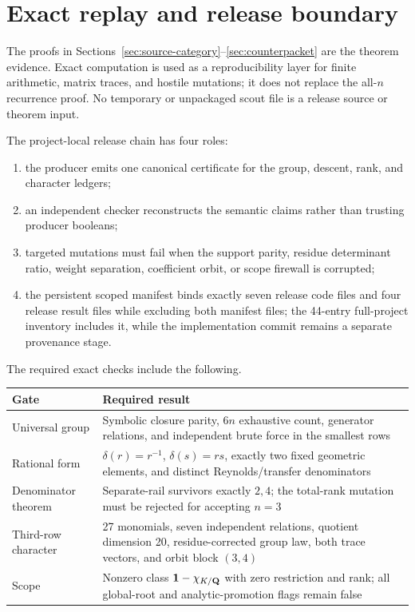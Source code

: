 \section{Exact replay and release boundary}
\label{sec:replay}

The proofs in Sections~\ref{sec:source-category}--\ref{sec:counterpacket}
are the theorem evidence.  Exact computation is used as a reproducibility
layer for finite arithmetic, matrix traces, and hostile mutations; it does
not replace the all-\(n\) recurrence proof.  No temporary or unpackaged
scout file is a release source or theorem input.

The project-local release chain has four roles:
\begin{enumerate}[leftmargin=*]
\item the producer emits one canonical certificate for the group, descent,
rank, and character ledgers;
\item an independent checker reconstructs the semantic claims rather than
trusting producer booleans;
\item targeted mutations must fail when the support parity, residue
determinant ratio, weight separation, coefficient orbit, or scope firewall is
corrupted;
\item the persistent scoped manifest binds exactly seven release code files
and four release result files while excluding both manifest files; the
44-entry full-project inventory includes it, while the implementation commit
remains a separate provenance stage.
\end{enumerate}

The required exact checks include the following.
\begin{center}
\small
\begin{tabular}{@{}p{}p{}@{}}
\toprule
Gate & Required result\\
\midrule
Universal group
& Symbolic closure parity, \(6n\) exhaustive count, generator relations,
and independent brute force in the smallest rows\\
Rational form
& \(\delta(r)=r^{-1}\), \(\delta(s)=rs\), exactly two fixed geometric
elements, and distinct Reynolds/transfer denominators\\
Denominator theorem
& Separate-rail survivors exactly \(2,4\); the total-rank mutation must be
rejected for accepting \(n=3\)\\
Third-row character
& 27 monomials, seven independent relations, quotient dimension 20,
residue-corrected group law, both trace vectors, and orbit block \((3,4)\)\\
Scope
& Nonzero class \(\mathbf 1-\chi_{K/\mathbf Q}\) with zero restriction and rank;
all global-root and analytic-promotion flags remain false\\
\bottomrule
\end{tabular}
\end{center}

